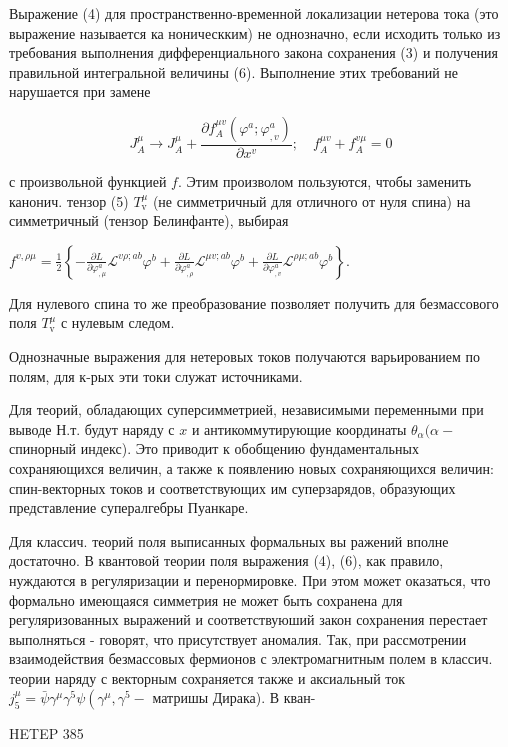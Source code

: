 \documentclass[10pt]{article}
\begin{document}
Выражение (4) для пространственно-временной локализации нетерова тока (это выражение называется ка ноническким) не однозначно, если исходить только из требования выполнения дифференциального закона сохранения (3) и получения правильной интегральной величины (6). Выполнение этих требований не нарушается при замене



\[

J_{A}^{\mu} \rightarrow J_{A}^{\mu}+\frac{\partial f_{A}^{\mu v}\left(\varphi^{a} ; \varphi_{, v}^{a}\right)}{\partial x^{v}} ; \quad f_{A}^{\mu v}+f_{A}^{v \mu}=0

\]



с произвольной функцией $f$. Этим произволом пользуются, чтобы заменить канонич. тензор (5) $T_{\mathrm{v}}^{\mu}$ (не симметричный для отличного от нуля спина) на симметричный (тензор Белинфанте), выбирая



$f^{v, \rho \mu}=\frac{1}{2}\left\{-\frac{\partial L}{\partial \varphi_{, \mu}^{a}} \mathscr{L}^{v \rho ; a b} \varphi^{b}+\frac{\partial L}{\partial \varphi_{, \rho}^{a}} \mathscr{L}^{\mu v ; a b} \varphi^{b}+\frac{\partial L}{\partial \varphi_{, v}^{a}} \mathscr{L}^{\rho \mu ; a b} \varphi^{b}\right\}$.



Для нулевого спина то же преобразование позволяет получить для безмассового поля $T_{\mathrm{v}}^{\mu}$ с нулевым следом.



Однозначные выражения для нетеровых токов получаются варьированием по полям, для к-рых эти токи служат источниками.



Для теорий, обладающих суперсимметрией, независимыми переменными при выводе Н.т. будут наряду с $x$ и антикоммутирующие координаты $\theta_{\alpha}(\alpha-$ спинорный индекс). Это приводит к обобщению фундаментальных сохраняющихся величин, а также к появлению новых сохраняющихся величин: спин-векторных токов и соответствующих им суперзарядов, образующих представление супералгебры Пуанкаре.



Для классич. теорий поля выписанных формальных вы ражений вполне достаточно. В квантовой теории поля выражения (4), (6), как правило, нуждаются в регуляризации и перенормировке. При этом может оказаться, что формально имеющаяся симметрия не может быть сохранена для регуляризованных выражений и соответствуюший закон сохранения перестает выполняться - говорят, что присутствует аномалия. Так, при рассмотрении взаимодействия безмассовых фермионов с электромагнитным полем в классич. теории наряду с векторным сохраняется также и аксиальный ток $j_{5}^{\mu}=\bar{\psi} \gamma^{\mu} \gamma^{5} \psi\left(\gamma^{\mu}, \gamma^{5}-\right.$ матришы Дирака). В кван-



HETEP 385
\end{document}
